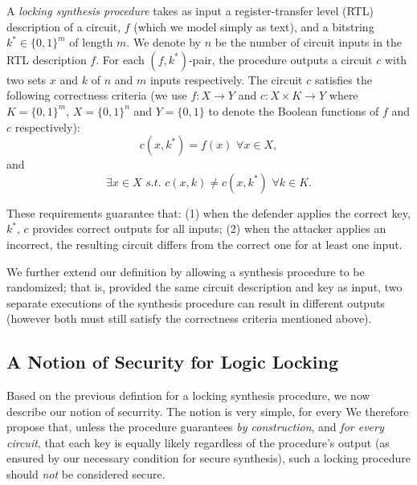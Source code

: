 \begin{definition}
A \emph{locking synthesis procedure} takes as input a register-transfer level (RTL) description of a circuit, $f$ (which we model simply as text), and a bitstring $k^{*} \in \{0,1\}^{m}$ of length $m$. We denote by $n$ be the number of circuit inputs in the RTL description $f$. For each $(f,k^*)$-pair, the procedure outputs a circuit $c$ with two sets $x$ and $k$ of $n$ and $m$ inputs respectively. The circuit $c$  satisfies the following correctness criteria (we use $f: X \rightarrow Y$ and $c: X \times K \rightarrow Y$ where $K = \{0,1\}^{m}$, $X = \{0,1\}^{n}$ and $Y = \{0,1\}$ to denote the Boolean functions of $f$ and $c$ respectively):
$$ c(x,k^{*}) = f(x) \, \, \forall x \in X, $$
and 
$$ \exists  x \in X \,\, s.t. \,\, c(x,k) \neq c(x,k^{*}) \, \, \forall k \in K.$$ 
\end{definition}



These requirements guarantee that: (1) when the defender applies the correct key, $k^{*}$,
$c$ provides correct outputs for all inputs; (2) when the attacker applies an incorrect, the resulting circuit differs from the correct one for at least one input.

We further extend our definition by allowing a synthesis procedure to be randomized; that is, provided the same circuit description and key as input, two separate executions of the synthesis procedure can result in different outputs (however both must still satisfy the correctness criteria mentioned above).

\subsection{A Notion of Security for Logic Locking}
 Based on the previous defintion for a locking synthesis procedure, we now describe our notion of securrity. The notion is very simple, for every We therefore propose that, unless the procedure guarantees \emph{by construction}, and \emph{for every circuit}, that each key is equally likely regardless of the procedure's output (as ensured by our necessary condition for secure synthesis), such a locking procedure should \emph{not} be considered secure.

